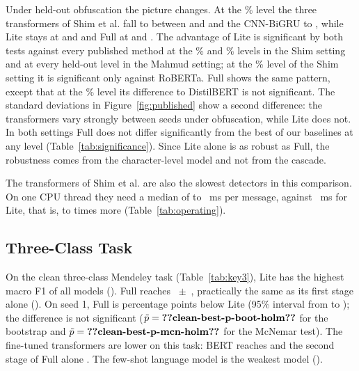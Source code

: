 Under held-out obfuscation the picture changes. At the \% level the three transformers of Shim et al. fall to between  and  and the CNN-BiGRU to , while Lite stays at  and  and Full at  and . The advantage of Lite is significant by both tests against every published method at the \% and \% levels in the Shim setting and at every held-out level in the Mahmud setting; at the \% level of the Shim setting it is significant only against RoBERTa. Full shows the same pattern, except that at the \% level its difference to DistilBERT is not significant. The standard deviations in Figure~\ref{fig:published} show a second difference: the transformers vary strongly between seeds under obfuscation, while Lite does not. In both settings Full does not differ significantly from the best of our baselines at any level (Table~\ref{tab:significance}). Since Lite alone is as robust as Full, the robustness comes from the character-level model and not from the cascade.

The transformers of Shim et al. are also the slowest detectors in this comparison. On one CPU thread they need a median of  to ~ms per message, against ~ms for Lite, that is,  to  times more (Table~\ref{tab:operating}).

\subsection{Three-Class Task}\label{sec:main}



On the clean three-class Mendeley task (Table~\ref{tab:key3}), Lite has the highest macro F1 of all models (). Full reaches ~$\pm$~, practically the same as its first stage alone (). On seed 1, Full is  percentage points below Lite (95\% interval from  to ); the difference is not significant ($\tilde{p}=\val{clean-best-p-boot-holm}$ for the bootstrap and $\tilde{p}=\val{clean-best-p-mcn-holm}$ for the McNemar test). The fine-tuned transformers are lower on this task: BERT reaches  and the second stage of Full alone . The few-shot language model is the weakest model ().

